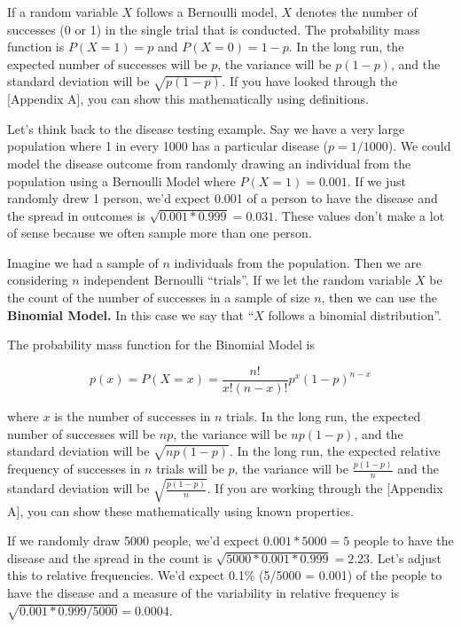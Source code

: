 \documentclass[
]{book}
\begin{document}
If a random variable \(X\) follows a Bernoulli model, \(X\) denotes the number of successes (0 or 1) in the single trial that is conducted. The probability mass function is \(P(X = 1) = p\) and \(P(X = 0) = 1-p\). In the long run, the expected number of successes will be \(p\), the variance will be \(p(1-p)\), and the standard deviation will be \(\sqrt{p(1-p)}\). If you have looked through the {[}Appendix A{]}, you can show this mathematically using definitions.

Let's think back to the disease testing example. Say we have a very large population where 1 in every 1000 has a particular disease (\(p = 1/1000\)). We could model the disease outcome from randomly drawing an individual from the population using a Bernoulli Model where \(P(X = 1) = 0.001\). If we just randomly drew 1 person, we'd expect 0.001 of a person to have the disease and the spread in outcomes is \(\sqrt{0.001*0.999} = 0.031\). These values don't make a lot of sense because we often sample more than one person.

Imagine we had a sample of \(n\) individuals from the population. Then we are considering \(n\) independent Bernoulli ``trials''. If we let the random variable \(X\) be the count of the number of successes in a sample of size \(n\), then we can use the \textbf{Binomial Model.} In this case we say that ``\(X\) follows a binomial distribution''.

The probability mass function for the Binomial Model is

\[p(x) = P(X = x) = \frac{n!}{x!(n-x)!}p^x(1-p)^{n-x}\]

where \(x\) is the number of successes in \(n\) trials. In the long run, the expected number of successes will be \(np\), the variance will be \(np(1-p)\), and the standard deviation will be \(\sqrt{np(1-p)}\). In the long run, the expected relative frequency of successes in \(n\) trials will be \(p\), the variance will be \(\frac{p(1-p)}{n}\) and the standard deviation will be \(\sqrt{\frac{p(1-p)}{n}}\). If you are working through the {[}Appendix A{]}, you can show these mathematically using known properties.

If we randomly draw 5000 people, we'd expect \(0.001*5000 = 5\) people to have the disease and the spread in the count is \(\sqrt{5000*0.001*0.999} = 2.23\). Let's adjust this to relative frequencies. We'd expect 0.1\% (5/5000 = 0.001) of the people to have the disease and a measure of the variability in relative frequency is \(\sqrt{0.001*0.999/5000} = 0.0004\).
\end{document}
